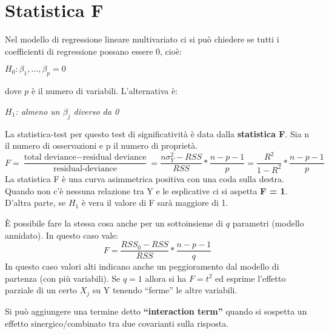 \section{Statistica F}
Nel modello di regressione lineare multivariato ci si può chiedere se tutti i coefficienti di regressione possano essere 0, cioè:
\begin{center}
	$H_{0}: \beta_{1}, \dots, \beta_{p} = 0$
\end{center}
dove $p$ \`e il numero di variabili. L'alternativa \`e:
\begin{center}
	$H_{1}$\textit{: almeno un $\beta_{j}$ diverso da 0}
\end{center}
La statistica-test per questo test di significativit\`a \`e data dalla \textbf{statistica F}. Sia n il numero di osservazioni e p il numero di proprietà.
\[ F = \frac{\text{total deviance} - \text{residual deviance}}{\text{residual-deviance}} = \frac{n\sigma^2_{Y} - RSS}{RSS} * \frac{n - p - 1}{p} = \frac{R^{2}}{1 - R^{2}} * \frac{n - p - 1}{p} \]
La statistica F è una curva asimmetrica positiva con una coda sulla destra.
Quando non c'\`e nessuna relazione tra Y e le esplicative ci si aspetta \textbf{F = 1}. D'altra parte, se $H_{1}$ è vera il valore di F sar\`a maggiore di 1.

È possibile fare la stessa cosa anche per un sottoinsieme di $q$ parametri (modello annidato). In questo caso vale:
\[ F = \frac{RSS_{0} - RSS}{RSS} * \frac{n - p - 1}{q} \]
In questo caso valori alti indicano anche un peggioramento dal modello di partenza (con più variabili). Se $q = 1$ allora si ha $F=t^{2}$ ed esprime l'effetto parziale di un certo $X_{j}$ su Y tenendo ``ferme'' le altre variabili.

Si può aggiungere una termine detto \textbf{``interaction term''} quando si sospetta un effetto sinergico/combinato tra due covarianti sulla risposta.
